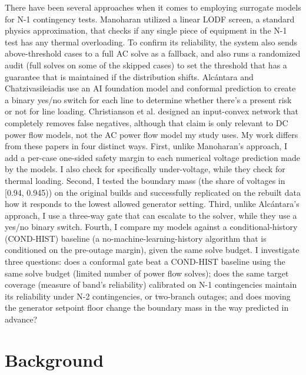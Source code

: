\documentclass[12pt]{article}
\begin{document}
There have been several approaches when it comes to employing surrogate models for N-1 contingency tests. Manoharan \cite{manoharan2026} utilized a linear LODF screen, a standard physics approximation, that checks if any single piece of equipment in the N-1 test has any thermal overloading. To confirm its reliability, the system also sends above-threshold cases to a full AC solve as a fallback, and also runs a randomized audit (full solves on some of the skipped cases) to set the threshold that has a guarantee that is maintained if the distribution shifts. Alc\'antara and Chatzivasileiadis \cite{alcantara2026} use an AI foundation model and conformal prediction to create a binary yes/no switch for each line to determine whether there's a present risk or not for line loading. Christianson et al. \cite{christianson2025} designed an input-convex network that completely removes false negatives, although that claim is only relevant to DC power flow models, not the AC power flow model my study uses. My work differs from these papers in four distinct ways. First, unlike Manoharan's approach, I add a per-case one-sided safety margin to each numerical voltage prediction made by the models. I also check for specifically under-voltage, while they check for thermal loading. Second, I tested the boundary mass (the share of voltages in [0.94, 0.945)) on the original builds and successfully replicated on the rebuilt data how it responds to the lowest allowed generator setting. Third, unlike Alc\'antara's approach, I use a three-way gate that can escalate to the solver, while they use a yes/no binary switch. Fourth, I compare my models against a conditional-history (COND-HIST) baseline (a no-machine-learning-history algorithm that is conditioned on the pre-outage margin), given the same solve budget. I investigate three questions: does a conformal gate beat a COND-HIST baseline using the same solve budget (limited number of power flow solves); does the same target coverage (measure of band's reliability) calibrated on N-1 contingencies maintain its reliability under N-2 contingencies, or two-branch outages; and does moving the generator setpoint floor change the boundary mass in the way predicted in advance?

\section{Background}
\label{sec:background}
\end{document}
